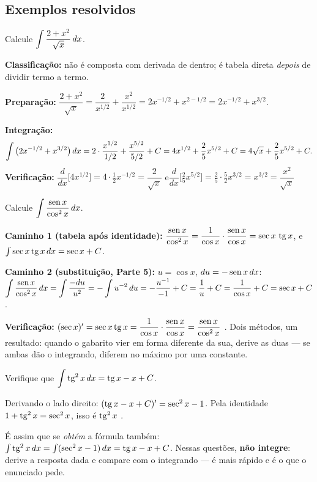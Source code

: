 \subsection{Exemplos resolvidos}

\begin{exemplo}
Calcule $\displaystyle\int \frac{2+x^2}{\sqrt{x}}\,dx$.

\textbf{Classificação:} não é composta com derivada de dentro; é tabela direta \emph{depois} de dividir termo a termo.

\textbf{Preparação:} $\dfrac{2+x^2}{\sqrt{x}} = \dfrac{2}{x^{1/2}} + \dfrac{x^2}{x^{1/2}} = 2x^{-1/2} + x^{2-1/2} = 2x^{-1/2}+x^{3/2}$.

\textbf{Integração:}
\[
\int \big(2x^{-1/2}+x^{3/2}\big)\,dx
= 2\cdot\frac{x^{1/2}}{1/2} + \frac{x^{5/2}}{5/2} + C
= 4x^{1/2} + \frac{2}{5}x^{5/2} + C
= 4\sqrt{x} + \frac{2}{5}x^{5/2} + C .
\]
\textbf{Verificação:} $\dfrac{d}{dx}\big[4x^{1/2}\big] = 4\cdot\tfrac12 x^{-1/2} = \dfrac{2}{\sqrt{x}}$ \ok\quad e\quad $\dfrac{d}{dx}\Big[\tfrac25 x^{5/2}\Big] = \tfrac25\cdot\tfrac52 x^{3/2} = x^{3/2} = \dfrac{x^2}{\sqrt x}$ \ok
\end{exemplo}

\begin{exemplo}
Calcule $\displaystyle\int \frac{\operatorname{sen} x}{\cos^2 x}\,dx$.

\textbf{Caminho 1 (tabela após identidade):} $\dfrac{\operatorname{sen} x}{\cos^2 x} = \dfrac{1}{\cos x}\cdot\dfrac{\operatorname{sen} x}{\cos x} = \sec x\,\operatorname{tg} x$, e $\int \sec x\operatorname{tg} x\,dx = \sec x + C$.

\textbf{Caminho 2 (substituição, Parte 5):} $u=\cos x$, $du=-\operatorname{sen} x\,dx$:
$\displaystyle\int \frac{\operatorname{sen} x}{\cos^2 x}\,dx = \int \frac{-du}{u^2} = -\int u^{-2}\,du = -\frac{u^{-1}}{-1}+C = \frac1u + C = \frac{1}{\cos x}+C = \sec x + C$.

\textbf{Verificação:} $(\sec x)' = \sec x\operatorname{tg} x = \dfrac{1}{\cos x}\cdot\dfrac{\operatorname{sen} x}{\cos x} = \dfrac{\operatorname{sen} x}{\cos^2 x}$ \ok. Dois métodos, um resultado: quando o gabarito vier em forma diferente da sua, derive as duas --- se ambas dão o integrando, diferem no máximo por uma constante.
\end{exemplo}

\begin{exemplo}
Verifique que $\displaystyle\int \operatorname{tg}^2 x\,dx = \operatorname{tg} x - x + C$.

Derivando o lado direito: $(\operatorname{tg} x - x + C)' = \sec^2 x - 1$. Pela identidade $1+\operatorname{tg}^2 x=\sec^2 x$, isso é $\operatorname{tg}^2 x$ \ok.

\smallskip
É assim que se \emph{obtém} a fórmula também: $\int \operatorname{tg}^2 x\,dx = \int(\sec^2 x - 1)\,dx = \operatorname{tg} x - x + C$. Nessas questões, \textbf{não integre}: derive a resposta dada e compare com o integrando --- é mais rápido e é o que o enunciado pede.
\end{exemplo}

